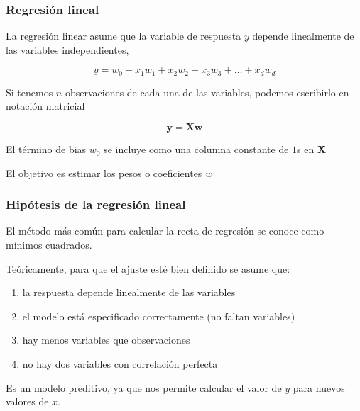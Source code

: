 \documentclass{beamer}
\newcommand{\Xbf}{\ensuremath{\mathbf{X}}}
\newcommand{\wbf}{\ensuremath{\mathbf{w}}}
\newcommand{\ybf}{\ensuremath{\mathbf{y}}}
\newenvironment{wideitemize}{\itemize\addtolength{\itemsep}{12pt}}{\enditemize}
\begin{document}
\begin{frame}
\frametitle{Regresión lineal}

\begin{wideitemize}

\item La regresión linear asume que la variable de respuesta $y$ depende linealmente de las variables independientes,

$$y = w_0 + x_1w_1 + x_2w_2 + x_3w_3 + \dots + x_dw_d$$

\item Si tenemos $n$ observaciones de cada una de las variables, podemos escribirlo en notación matricial

$$\ybf = \Xbf\wbf$$

\item El término de bias $w_0$ se incluye como una columna constante de $1$s en $\Xbf$

\item El objetivo es estimar los pesos o coeficientes $w$
\end{wideitemize}
\end{frame}


\begin{frame}
\frametitle{Hipótesis de la regresión lineal}

\begin{wideitemize}
\item El método más común para calcular la recta de regresión se conoce como mínimos cuadrados.


\item Teóricamente, para que el ajuste esté bien definido se asume que:
\begin{enumerate}
\item la respuesta depende linealmente de las variables
\item el modelo está especificado correctamente (no faltan variables)
\item hay menos variables que observaciones
\item no hay dos variables con correlación perfecta
\end{enumerate}

\item Es un modelo preditivo, ya que nos permite calcular el valor de $y$ para nuevos valores de $x$.

\end{wideitemize}
\end{frame}
\end{document}
